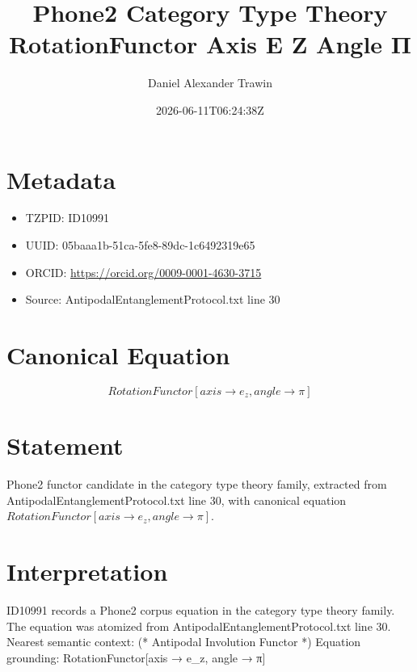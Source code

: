\documentclass[11pt]{article}
\title{Phone2 Category Type Theory RotationFunctor Axis E Z Angle Π}
\author{Daniel Alexander Trawin}
\date{2026-06-11T06:24:38Z}
\begin{document}
\maketitle
\section*{Metadata}
\begin{itemize}
\item TZPID: ID10991
\item UUID: 05baaa1b-51ca-5fe8-89dc-1c6492319e65
\item ORCID: \url{https://orcid.org/0009-0001-4630-3715}
\item Source: AntipodalEntanglementProtocol.txt line 30
\end{itemize}
\section*{Canonical Equation}
\[
RotationFunctor[axis → e_z, angle → π]
\]
\section*{Statement}
Phone2 functor candidate in the category type theory family, extracted from AntipodalEntanglementProtocol.txt line 30, with canonical equation $RotationFunctor[axis → e_z, angle → π]$.
\section*{Interpretation}
ID10991 records a Phone2 corpus equation in the category type theory family. The equation was atomized from AntipodalEntanglementProtocol.txt line 30. Nearest semantic context: (* Antipodal Involution Functor *) Equation grounding: RotationFunctor[axis → e_z, angle → π]
\end{document}
